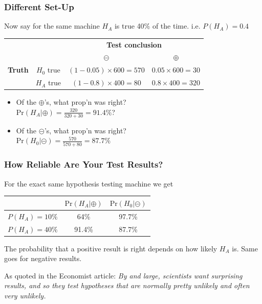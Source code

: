 \documentclass[slides]{beamer}
\newcommand{\blue}[1]{\textcolor{blue2}{#1}}
\newcommand{\prob}{\mbox{Pr}}
\newcommand{\cp}{\oplus}
\newcommand{\cm}{\circleddash}
\begin{document}
\begin{frame}
\frametitle{Different Set-Up}
Now say for the same machine $H_A$ is true 40\% of the time. i.e. $P(H_A)=0.4$
\pause
\begin{center}
  \begin{tabular}{cc|cc}
     \multicolumn{2}{c}{}  & \multicolumn{2}{c}{\textbf{Test conclusion}} \\ 
     &  & $\cm$ & $\cp$ \\ 
\hline
    \textbf{Truth} & $H_0$ true & $(1-0.05) \times 600 = 570$ & $0.05 \times 600 = 30$ \\
     & $H_A$ true & $(1-0.8)\times 400=80$ & $0.8\times 400= 320$\\ 
    \hline
  \end{tabular}
\end{center}

\begin{itemize}
\pause\item Of the $\cp$'s, what prop'n was right?\\
$\prob(H_A|\cp) = \frac{320}{320+30} = 91.4\%$?  
\pause\item Of the $\cm$'s, what prop'n was right?\\
$\prob(H_0|\cm) = \frac{570}{570+80} = 87.7\%$

\end{itemize}

\end{frame}



\begin{frame}[fragile]
\frametitle{How Reliable Are Your Test Results?}

For the \blue{exact same} hypothesis testing machine we get

\begin{center}
  \begin{tabular}{c|cc}
    \hline
    & $\prob(H_A|\cp)$ & $\prob(H_0|\cm)$ \\ 
    \hline
    $P(H_A)=10\%$ & 64\% & 97.7\% \\ 
    $P(H_A)=40\%$ & 91.4\% & 87.7\% \\ 
    \hline
  \end{tabular}
\end{center}
\pause
\vspace{0.5cm}

The probability that a positive result is right depends on how likely $H_A$ is.  Same goes for negative results.  
\pause
\vspace{0.5cm}

As quoted in the Economist article:  \textit{By and large, scientists want surprising results, and so they test hypotheses that are normally pretty unlikely and often very unlikely.}

\end{frame}
\end{document}
